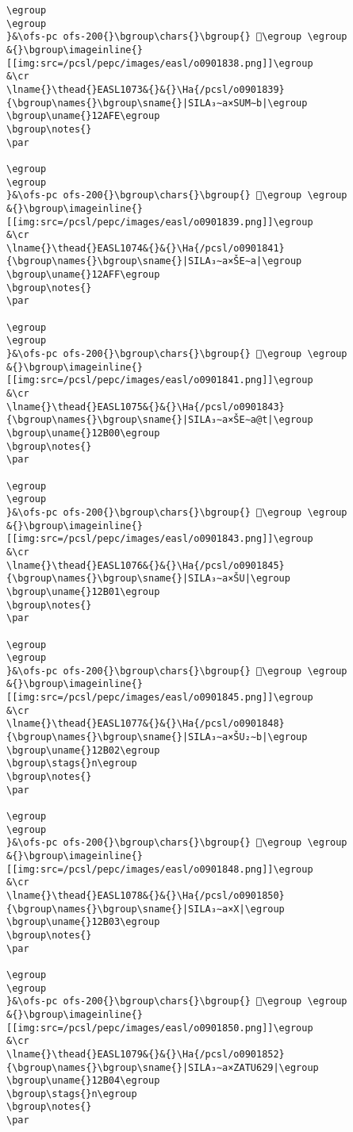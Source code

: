 \begin{verbatim}
\egroup
\egroup
}&\ofs-pc ofs-200{}\bgroup\chars{}\bgroup{} 𒫽\egroup \egroup
&{}\bgroup\imageinline{}[[img:src=/pcsl/pepc/images/easl/o0901838.png]]\egroup
&\cr
\lname{}\thead{}EASL1073&{}&{}\Ha{/pcsl/o0901839}{\bgroup\names{}\bgroup\sname{}|SILA₃∼a×SUM∼b|\egroup
\bgroup\uname{}12AFE\egroup
\bgroup\notes{}
\par 

\egroup
\egroup
}&\ofs-pc ofs-200{}\bgroup\chars{}\bgroup{} 𒫾\egroup \egroup
&{}\bgroup\imageinline{}[[img:src=/pcsl/pepc/images/easl/o0901839.png]]\egroup
&\cr
\lname{}\thead{}EASL1074&{}&{}\Ha{/pcsl/o0901841}{\bgroup\names{}\bgroup\sname{}|SILA₃∼a×ŠE∼a|\egroup
\bgroup\uname{}12AFF\egroup
\bgroup\notes{}
\par 

\egroup
\egroup
}&\ofs-pc ofs-200{}\bgroup\chars{}\bgroup{} 𒫿\egroup \egroup
&{}\bgroup\imageinline{}[[img:src=/pcsl/pepc/images/easl/o0901841.png]]\egroup
&\cr
\lname{}\thead{}EASL1075&{}&{}\Ha{/pcsl/o0901843}{\bgroup\names{}\bgroup\sname{}|SILA₃∼a×ŠE∼a@t|\egroup
\bgroup\uname{}12B00\egroup
\bgroup\notes{}
\par 

\egroup
\egroup
}&\ofs-pc ofs-200{}\bgroup\chars{}\bgroup{} 𒬀\egroup \egroup
&{}\bgroup\imageinline{}[[img:src=/pcsl/pepc/images/easl/o0901843.png]]\egroup
&\cr
\lname{}\thead{}EASL1076&{}&{}\Ha{/pcsl/o0901845}{\bgroup\names{}\bgroup\sname{}|SILA₃∼a×ŠU|\egroup
\bgroup\uname{}12B01\egroup
\bgroup\notes{}
\par 

\egroup
\egroup
}&\ofs-pc ofs-200{}\bgroup\chars{}\bgroup{} 𒬁\egroup \egroup
&{}\bgroup\imageinline{}[[img:src=/pcsl/pepc/images/easl/o0901845.png]]\egroup
&\cr
\lname{}\thead{}EASL1077&{}&{}\Ha{/pcsl/o0901848}{\bgroup\names{}\bgroup\sname{}|SILA₃∼a×ŠU₂∼b|\egroup
\bgroup\uname{}12B02\egroup
\bgroup\stags{}n\egroup
\bgroup\notes{}
\par 

\egroup
\egroup
}&\ofs-pc ofs-200{}\bgroup\chars{}\bgroup{} 𒬂\egroup \egroup
&{}\bgroup\imageinline{}[[img:src=/pcsl/pepc/images/easl/o0901848.png]]\egroup
&\cr
\lname{}\thead{}EASL1078&{}&{}\Ha{/pcsl/o0901850}{\bgroup\names{}\bgroup\sname{}|SILA₃∼a×X|\egroup
\bgroup\uname{}12B03\egroup
\bgroup\notes{}
\par 

\egroup
\egroup
}&\ofs-pc ofs-200{}\bgroup\chars{}\bgroup{} 𒬃\egroup \egroup
&{}\bgroup\imageinline{}[[img:src=/pcsl/pepc/images/easl/o0901850.png]]\egroup
&\cr
\lname{}\thead{}EASL1079&{}&{}\Ha{/pcsl/o0901852}{\bgroup\names{}\bgroup\sname{}|SILA₃∼a×ZATU629|\egroup
\bgroup\uname{}12B04\egroup
\bgroup\stags{}n\egroup
\bgroup\notes{}
\par 


\end{verbatim}
